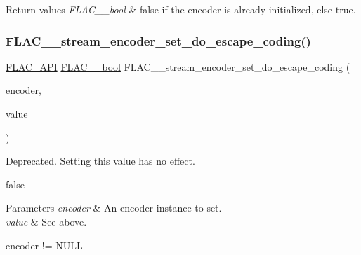 \begin{DoxyRetVals}{Return values}
{\em F\+L\+A\+C\+\_\+\+\_\+bool} & {\ttfamily false} if the encoder is already initialized, else {\ttfamily true}. \\
\hline
\end{DoxyRetVals}
\mbox{\label{group__flac__stream__encoder_gaa839d19b6d1b30ba0407d419bdb6fe67}} 
\subsubsection{\texorpdfstring{F\+L\+A\+C\+\_\+\+\_\+stream\+\_\+encoder\+\_\+set\+\_\+do\+\_\+escape\+\_\+coding()}{FLAC\_\_stream\_encoder\_set\_do\_escape\_coding()}}
{\footnotesize\ttfamily \hyperlink{group__flac__export_ga56ca07df8a23310707732b1c0007d6f5}{F\+L\+A\+C\+\_\+\+A\+PI} \hyperlink{ordinals_8h_a95103469f1cbd78b8cf250194985b34e}{F\+L\+A\+C\+\_\+\+\_\+bool} F\+L\+A\+C\+\_\+\+\_\+stream\+\_\+encoder\+\_\+set\+\_\+do\+\_\+escape\+\_\+coding (\begin{DoxyParamCaption}\item[{\hyperlink{struct_f_l_a_c_____stream_encoder}{F\+L\+A\+C\+\_\+\+\_\+\+Stream\+Encoder} $\ast$}]{encoder,  }\item[{\hyperlink{ordinals_8h_a95103469f1cbd78b8cf250194985b34e}{F\+L\+A\+C\+\_\+\+\_\+bool}}]{value }\end{DoxyParamCaption})}

Deprecated. Setting this value has no effect.

{\ttfamily false} 
\begin{DoxyParams}{Parameters}
{\em encoder} & An encoder instance to set. \\
\hline
{\em value} & See above.  
\begin{DoxyCode}
encoder != NULL 
\end{DoxyCode}
 \\
\hline
\end{DoxyParams}

